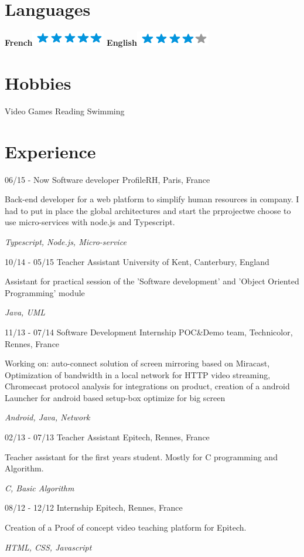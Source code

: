 \documentclass[10pt]{friggeri-cv}
\begin{document}
\begin{aside}
  \section{Languages}
    \textbf{French}\includegraphics[scale=0.40]{img/5stars.png}
    \textbf{English}\includegraphics[scale=0.40]{img/4stars.png}
  \section{Hobbies}
    Video Games
    Reading
    Swimming
\end{aside}

\section{Experience}
\begin{entrylist}
\entry
    {06/15 - Now}
    {Software developer}
    {ProfileRH, Paris, France}
    {Back-end developer for a web platform to simplify human resources in company. I had to put in place the global architectures and start the prprojectwe choose to use micro-services with node.js and Typescript.
    \begin{FlushRight}\textit{Typescript, Node.js, Micro-service}\end{FlushRight}}
  \entry
    {10/14 - 05/15}
    {Teacher Assistant}
    {University of Kent, Canterbury, England}
    {Assistant for practical session of the 'Software development' and 'Object Oriented Programming' module
    \begin{FlushRight}\textit{Java, UML}\end{FlushRight}}
  \entry
    {11/13 - 07/14}
    {Software Development Internship}
    {POC\&Demo team, Technicolor, Rennes, France}
    {Working on: auto-connect solution of screen mirroring based on Miracast, Optimization of bandwidth in a local network for HTTP video streaming, Chromecast protocol analysis for integrations on product, creation of a android Launcher for android based setup-box optimize for big screen \begin{FlushRight}\textit{Android, Java, Network}\end{FlushRight}}
    \entry
    {02/13 - 07/13}
    {Teacher Assistant}
    {Epitech, Rennes, France}
    {Teacher assistant for the first years student. Mostly for C programming and Algorithm.
    \begin{FlushRight}\textit{C, Basic Algorithm}\end{FlushRight}}
    \entry
    {08/12 - 12/12}
    {Internship}
    {Epitech, Rennes, France}
    {Creation of a Proof of concept video teaching platform for Epitech.
    \begin{FlushRight}\textit{HTML, CSS, Javascript}\end{FlushRight}}
\end{entrylist}
\end{document}
